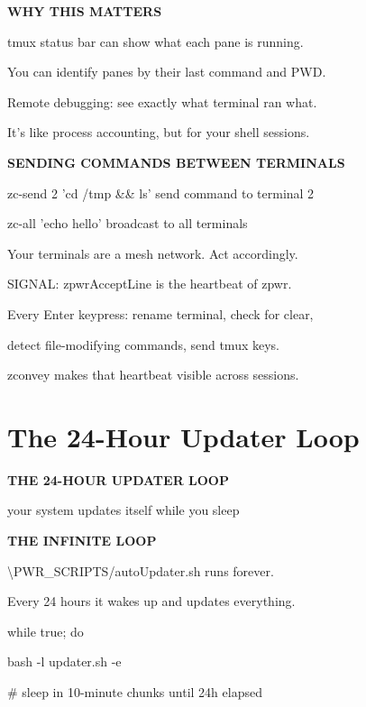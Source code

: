 \documentclass[11pt,a4paper,twoside]{book}
\begin{document}
\vspace{12pt}
{\bfseries\color{neonyellow} WHY THIS MATTERS}\vspace{4pt}

tmux status bar can show what each pane is running.

You can identify panes by their last command and PWD.

Remote debugging: see exactly what terminal ran what.

It's like process accounting, but for your shell sessions.


\vspace{12pt}
{\bfseries\color{neonyellow} SENDING COMMANDS BETWEEN TERMINALS}\vspace{4pt}

zc-send 2 'cd /tmp \&\& ls'  send command to terminal 2

zc-all 'echo hello'        broadcast to all terminals

Your terminals are a mesh network. Act accordingly.

SIGNAL: zpwrAcceptLine is the heartbeat of zpwr.

Every Enter keypress: rename terminal, check for clear,

detect file-modifying commands, send tmux keys.

zconvey makes that heartbeat visible across sessions.


\vspace{16pt}

\section{The 24-Hour Updater Loop}


\vspace{10pt}
{\large\bfseries\color{neoncyan} THE 24-HOUR UPDATER LOOP}\vspace{6pt}

your system updates itself while you sleep


\vspace{12pt}
{\bfseries\color{neonyellow} THE INFINITE LOOP}\vspace{4pt}

\textbackslash{}PWR\_SCRIPTS/autoUpdater.sh runs forever.

Every 24 hours it wakes up and updates everything.

while true; do

bash -l updater.sh -e

\# sleep in 10-minute chunks until 24h elapsed
\end{document}
